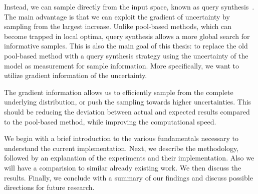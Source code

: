 Instead, we can sample directly from the input space, known as query synthesis~\cite{Angluin1988}. 
The main advantage is that we can exploit the gradient of uncertainty by sampling from the largest 
increase. Unlike pool-based methods, which can become trapped in local optima, query synthesis 
allows a more global search for informative samples. This is also the main goal of this thesis: 
to replace the old pool-based method with a query synthesis strategy using the uncertainty of the model as measurement for sample information. More specifically, we want to utilize gradient information of the uncertainty. 

The gradient information allows us to efficiently sample from the complete underlying distribution, or push the sampling towards higher uncertainties.
This should be reducing the deviation between actual and expected results 
compared to the pool-based method, while improving the computational speed.

We begin with a brief introduction to the various fundamentals necessary to understand the 
current implementation. 
Next, we describe the methodology, followed by an explanation of the experiments and their implementation. 
Also we will have a comparision to similar already existing work.
We then discuss the results. Finally, we conclude with a summary of our findings and discuss 
possible directions for future research.
